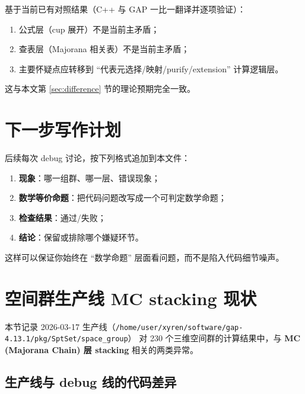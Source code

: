 \documentclass[a4paper,fontset=ubuntu,12pt]{ctexart}
\begin{document}
基于当前已有对照结果（C++ 与 GAP 一比一翻译并逐项验证）：
\begin{enumerate}
\item 公式层（cup 展开）不是当前主矛盾；
\item 查表层（Majorana 相关表）不是当前主矛盾；
\item 主要怀疑点应转移到 ``代表元选择/映射/purify/extension'' 计算逻辑层。
\end{enumerate}

这与本文第 \ref{sec:difference} 节的理论预期完全一致。

\section{下一步写作计划}
\label{sec:plan}

后续每次 debug 讨论，按下列格式追加到本文件：
\begin{enumerate}
\item \textbf{现象}：哪一组群、哪一层、错误现象；
\item \textbf{数学等价命题}：把代码问题改写成一个可判定数学命题；
\item \textbf{检查结果}：通过/失败；
\item \textbf{结论}：保留或排除哪个嫌疑环节。
\end{enumerate}

这样可以保证你始终在 ``数学命题'' 层面看问题，而不是陷入代码细节噪声。


\section{空间群生产线 MC stacking 现状}
\label{sec:spacegroup-mc-status}

本节记录 2026-03-17 生产线（\texttt{/home/user/xyren/software/gap-4.13.1/pkg/SptSet/space\_group}）
对 230 个三维空间群的计算结果中，与 \textbf{MC (Majorana Chain) 层 stacking} 相关的两类异常。

\subsection{生产线与 debug 线的代码差异}
\label{sec:prod-vs-debug}
\end{document}
